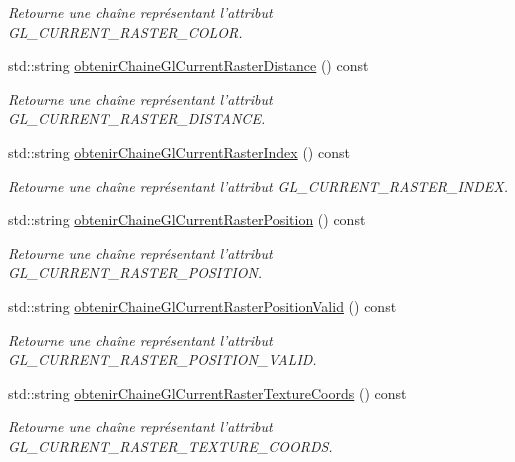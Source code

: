 \begin{DoxyCompactItemize}
\begin{DoxyCompactList}\small\item\em Retourne une chaîne représentant l'attribut G\-L\-\_\-\-C\-U\-R\-R\-E\-N\-T\-\_\-\-R\-A\-S\-T\-E\-R\-\_\-\-C\-O\-L\-O\-R. \end{DoxyCompactList}\item 
std\-::string \hyperlink{group__utilitaire_ga130c72bf45a65d7d7770c77c7f71cf5c}{obtenir\-Chaine\-Gl\-Current\-Raster\-Distance} () const 
\begin{DoxyCompactList}\small\item\em Retourne une chaîne représentant l'attribut G\-L\-\_\-\-C\-U\-R\-R\-E\-N\-T\-\_\-\-R\-A\-S\-T\-E\-R\-\_\-\-D\-I\-S\-T\-A\-N\-C\-E. \end{DoxyCompactList}\item 
std\-::string \hyperlink{group__utilitaire_ga9d14728a6f086186ff9ec92738952892}{obtenir\-Chaine\-Gl\-Current\-Raster\-Index} () const 
\begin{DoxyCompactList}\small\item\em Retourne une chaîne représentant l'attribut G\-L\-\_\-\-C\-U\-R\-R\-E\-N\-T\-\_\-\-R\-A\-S\-T\-E\-R\-\_\-\-I\-N\-D\-E\-X. \end{DoxyCompactList}\item 
std\-::string \hyperlink{group__utilitaire_ga1151f4eee3a50e14e0157b18b6fefaa4}{obtenir\-Chaine\-Gl\-Current\-Raster\-Position} () const 
\begin{DoxyCompactList}\small\item\em Retourne une chaîne représentant l'attribut G\-L\-\_\-\-C\-U\-R\-R\-E\-N\-T\-\_\-\-R\-A\-S\-T\-E\-R\-\_\-\-P\-O\-S\-I\-T\-I\-O\-N. \end{DoxyCompactList}\item 
std\-::string \hyperlink{group__utilitaire_gaa95c762062531085430d3bd8381c1ab1}{obtenir\-Chaine\-Gl\-Current\-Raster\-Position\-Valid} () const 
\begin{DoxyCompactList}\small\item\em Retourne une chaîne représentant l'attribut G\-L\-\_\-\-C\-U\-R\-R\-E\-N\-T\-\_\-\-R\-A\-S\-T\-E\-R\-\_\-\-P\-O\-S\-I\-T\-I\-O\-N\-\_\-\-V\-A\-L\-I\-D. \end{DoxyCompactList}\item 
std\-::string \hyperlink{group__utilitaire_gae1b30e504db9237dce13eade239c8c5a}{obtenir\-Chaine\-Gl\-Current\-Raster\-Texture\-Coords} () const 
\begin{DoxyCompactList}\small\item\em Retourne une chaîne représentant l'attribut G\-L\-\_\-\-C\-U\-R\-R\-E\-N\-T\-\_\-\-R\-A\-S\-T\-E\-R\-\_\-\-T\-E\-X\-T\-U\-R\-E\-\_\-\-C\-O\-O\-R\-D\-S. \end{DoxyCompactList}\item 

\end{DoxyCompactItemize}
